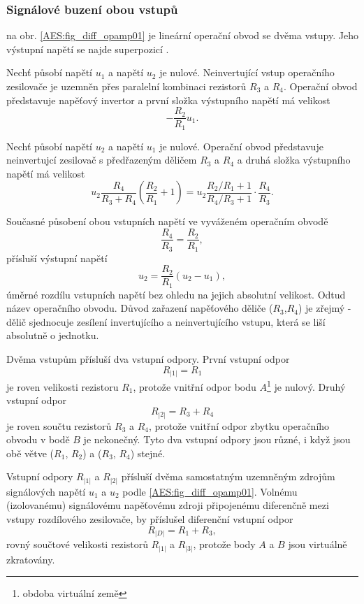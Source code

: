       \subsubsection{Signálové buzení obou vstupů}
         na obr. \ref{AES:fig_diff_opamp01} je lineární operační obvod se dvěma vstupy. Jeho výstupní napětí se najde superpozicí \cite[s.~126]{Dostal}. 
        
        Nechť působí napětí $u_1$ a napětí $u_2$ je nulové. Neinvertující vstup operačního 
        zesilovače je uzemněn přes paralelní kombinaci rezistorů $R_3$ a $R_4$. Operační obvod 
        představuje napěťový invertor a první složka výstupního napětí má velikost 
        $$-\frac{R_2}{R_1}u_1.$$
        
        Nechť působí napětí $u_2$ a napětí $u_1$ je nulové. Operační obvod představuje neinvertujcí 
        zesilovač s předřazeným děličem $R_3$ a $R_4$ a druhá složka výstupního napětí má velikost 
        $$u_2\frac{R_4}{R_3+R_4}\left(\frac{R_2}{R_1}+1\right)= 
        u_2\frac{R_2/R_1+1}{R_4/R_3+1}\cdot\frac{R_4}{R_3}.$$
        
         
               
        Současné působení obou vstupních napětí ve vyváženém operačním obvodě $$\frac{R_4}{R_3}=\frac{R_2}{R_1},$$ přísluší výstupní napětí 
        \begin{equation}\label{AES:eq_diff_opamp}
          u_2 = \frac{R_2}{R_1}(u_2-u_1),   
        \end{equation}
        úměrné rozdílu vstupních napětí bez ohledu na jejich absolutní velikost. Odtud název 
        operačního obvodu. Důvod zařazení napěťového děliče ($R_3$,$R_4$) je zřejmý - dělič 
        sjednocuje zesílení invertujícího a neinvertujícího vstupu, která se liší absolutně o 
        jednotku. 
        
        Dvěma vstupům přísluší dva vstupní odpory. První vstupní odpor $$R_{|1|} = R_1$$ je roven 
        velikosti rezistoru $R_1$, protože vnitřní odpor bodu $A$\footnote{obdoba virtuální země} je 
        nulový. Druhý vstupní odpor $$R_{|2|} = R_3 + R_4$$ je roven součtu rezistorů $R_3$ a $R_4$, 
        protože vnitřní odpor zbytku operačního obvodu v bodě $B$ je nekonečný. Tyto dva vstupní 
        odpory jsou různé, i když jsou obě větve ($R_1$, $R_2$) a ($R_3$, $R_4$) stejné. 
        
        Vstupní odpory $R_{|1|}$ a $R_{|2|}$ přísluší dvěma samostatným uzemněným zdrojům 
        signálových napětí $u_1$ a $u_2$ podle \ref{AES:fig_diff_opamp01}. Volnému (izolovanému) 
        signálovému napěťovému zdroji připojenému diferenčně mezi vstupy rozdílového zesilovače, by 
        příslušel diferenční vstupní odpor $$R_{|D|} = R_1 + R_3,$$ rovný součtové velikosti 
        rezistorů $R_{|1|}$ a $R_{|3|}$, protože body $A$ a $B$ jsou virtuálně zkratovány.